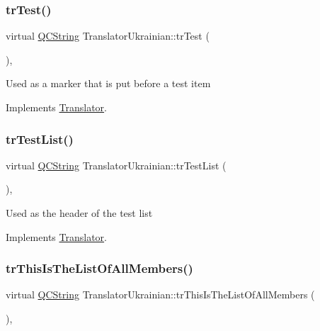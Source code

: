 \subsubsection{\texorpdfstring{trTest()}{trTest()}}
{\footnotesize\ttfamily virtual \mbox{\hyperlink{class_q_c_string}{Q\+C\+String}} Translator\+Ukrainian\+::tr\+Test (\begin{DoxyParamCaption}{ }\end{DoxyParamCaption})\hspace{0.3cm}{\ttfamily [inline]}, {\ttfamily [virtual]}}

Used as a marker that is put before a test item 

Implements \mbox{\hyperlink{class_translator}{Translator}}.

\mbox{\label{class_translator_ukrainian_ac1fac7692a6dbb8b7e473340a9f80688}} 
\subsubsection{\texorpdfstring{trTestList()}{trTestList()}}
{\footnotesize\ttfamily virtual \mbox{\hyperlink{class_q_c_string}{Q\+C\+String}} Translator\+Ukrainian\+::tr\+Test\+List (\begin{DoxyParamCaption}{ }\end{DoxyParamCaption})\hspace{0.3cm}{\ttfamily [inline]}, {\ttfamily [virtual]}}

Used as the header of the test list 

Implements \mbox{\hyperlink{class_translator}{Translator}}.

\mbox{\label{class_translator_ukrainian_a6345a0832f7d02b1702db47d2db8da95}} 
\subsubsection{\texorpdfstring{trThisIsTheListOfAllMembers()}{trThisIsTheListOfAllMembers()}}
{\footnotesize\ttfamily virtual \mbox{\hyperlink{class_q_c_string}{Q\+C\+String}} Translator\+Ukrainian\+::tr\+This\+Is\+The\+List\+Of\+All\+Members (\begin{DoxyParamCaption}{ }\end{DoxyParamCaption})\hspace{0.3cm}{\ttfamily [inline]}, {\ttfamily [virtual]}}

